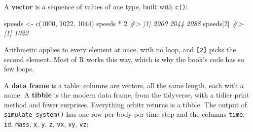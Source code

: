 \documentclass[
  10.5pt,
  letterpaper,
]{scrbook}
\newenvironment{Shaded}{\begin{snugshade}}{\end{snugshade}}
\newcommand{\CommentTok}[1]{\textcolor[rgb]{0.00,0.00,0.00}{\textit{#1}}}
\newcommand{\DecValTok}[1]{\textcolor[rgb]{0.00,0.00,0.00}{#1}}
\newcommand{\FunctionTok}[1]{\textcolor[rgb]{0.00,0.00,0.00}{#1}}
\newcommand{\NormalTok}[1]{\textcolor[rgb]{0.00,0.00,0.00}{#1}}
\newcommand{\OtherTok}[1]{\textcolor[rgb]{0.00,0.00,0.00}{#1}}
\newcommand{\SpecialCharTok}[1]{\textcolor[rgb]{0.00,0.00,0.00}{#1}}
\theoremstyle{plain}
\theoremstyle{remark}
\begin{document}
A \textbf{vector} is a sequence of values of one type, built with
\texttt{c()}:

\begin{Shaded}
\begin{Highlighting}[]
\NormalTok{speeds }\OtherTok{\textless{}{-}} \FunctionTok{c}\NormalTok{(}\DecValTok{1000}\NormalTok{, }\DecValTok{1022}\NormalTok{, }\DecValTok{1044}\NormalTok{)}
\NormalTok{speeds }\SpecialCharTok{*} \DecValTok{2}
\CommentTok{\#\textgreater{} [1] 2000 2044 2088}
\NormalTok{speeds[}\DecValTok{2}\NormalTok{]}
\CommentTok{\#\textgreater{} [1] 1022}
\end{Highlighting}
\end{Shaded}

Arithmetic applies to every element at once, with no loop, and
\texttt{{[}2{]}} picks the second element. Most of R works this way,
which is why the book's code has so few loops.

A \textbf{data frame} is a table: columns are vectors, all the same
length, each with a name. A \textbf{tibble} is the modern data frame,
from the tidyverse, with a tidier print method and fewer surprises.
Everything orbitr returns is a tibble. The output of
\texttt{simulate\_system()} has one row per body per time step and the
columns \texttt{time}, \texttt{id}, \texttt{mass}, \texttt{x},
\texttt{y}, \texttt{z}, \texttt{vx}, \texttt{vy}, \texttt{vz}:
\end{document}
